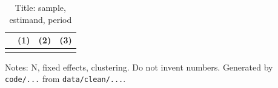 \begin{table}[htbp]
\centering
\caption{Title: sample, estimand, period}
\label{tab:T1_purpose}
\begin{tabular}{lccc}
\toprule
 & (1) & (2) & (3) \\
\midrule
 &  &  &  \\
\bottomrule
\end{tabular}

\vspace{0.5em}
{\footnotesize Notes: N, fixed effects, clustering. Do not invent numbers.
Generated by \texttt{code/...} from \texttt{data/clean/...}.}
\end{table}
